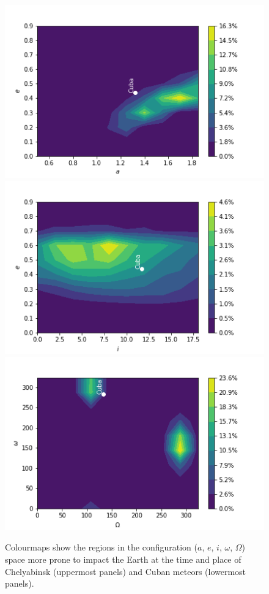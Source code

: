 \documentclass[fleqn,usenatbib]{mnras}
\begin{document}
\begin{figure}
   \\
   \includegraphics[scale=0.38]{ae-Cuba.png}\hspace{-0.1em}%
   \includegraphics[scale=0.38]{ie-Cuba.png}\hspace{-0.1em}%
   \includegraphics[scale=0.38]{Wo-Cuba.png}\hspace{-0.1em}%
\caption{Colourmaps show the regions in the configuration ($a$, $e$, $i$, $\omega$, $\Omega$) space more prone to impact the Earth at the time and place of Chelyabinsk (uppermost panels) and Cuban meteors (lowermost panels). }
\label{fig:orbital}
\end{figure}
\end{document}

